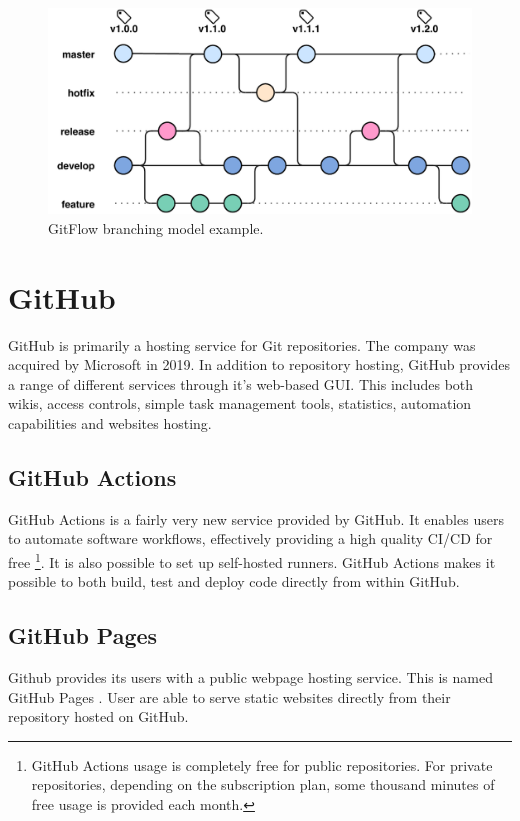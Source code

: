 \begin{figure}[h]
    \centering
    \includegraphics[page=1,width=\textwidth]{sections/theory/figures/gitflow.pdf}
    \caption{GitFlow branching model example.}
    \label{fig:gitflow}
\end{figure}

\section{GitHub}
GitHub is primarily a hosting service for Git repositories. The company was acquired by Microsoft in 2019. In addition to repository hosting, GitHub provides a range of different services through it's web-based GUI. This includes both wikis, access controls, simple task management tools, statistics, automation capabilities and websites hosting.

\subsection{GitHub Actions}
GitHub Actions \cite{github-actions} is a fairly very new service provided by GitHub. It enables users to automate software workflows, effectively providing a high quality CI/CD for free \footnote{GitHub Actions usage is completely free for public repositories. For private repositories, depending on the subscription plan, some thousand minutes of free usage is provided each month.}. It is also possible to set up self-hosted runners. GitHub Actions makes it possible to both build, test and deploy code directly from within GitHub.

\subsection{GitHub Pages}
Github provides its users with a public webpage hosting service. This is named GitHub Pages \cite{github-pages}. User are able to serve static websites directly from their repository hosted on GitHub.


